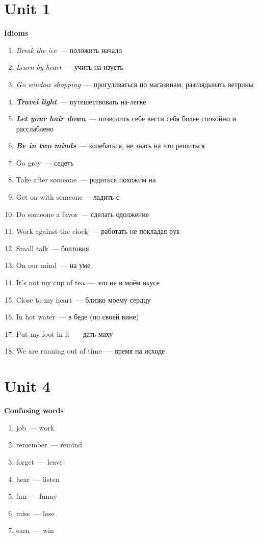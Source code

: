 \documentclass[10pt,a4paper]{article}
\begin{document}
\section{Unit 1}
\textbf{Idioms}

\begin{enumerate}
 \item \textit{Break the ice}~--- положить начало 
 \item \textit{Learn by heart}~--- учить на изусть
 \item \textit{Go window shopping}~--- прогуливаться по магазинам, разглядывать ветрины
 \item \textit{\textbf{Travel light}}~--- путешествовать на-легке
 \item \textit{\textbf{Let your hair down}}~--- позволить себе вести себя более спокойно и расслаблено
 \item \textit{\textbf{Be in two minds}}~--- колебаться, не знать на что решиться
 \item Go grey~--- седеть
 \item Take after someone~--- родиться похожим на
 \item Get on with someone~---ладить с 
 \item Do someone a favor~--- сделать одолжение
 \item Work against the clock~--- работать не покладая рук
 \item Small talk~--- болтовня
 \item On our mind~--- на уме
 \item It's not my cup of tea~--- это не в моём вкусе
 \item Close to my heart~--- близко моему сердцу
 \item In hot water~--- в беде (по своей вине)
 \item Put my foot in it~--- дать маху
 \item We are running out of time~--- время на исходе
\end{enumerate}



\section{Unit 4}

\textbf{Confusing words}
\begin{enumerate}
  \item job~--- work
  \item remember~--- remind
  \item forget~--- leave
  \item hear~--- listen
  \item fun~--- funny
  \item miss~--- lose
  \item earn~--- win
\end{enumerate}
\end{document}
